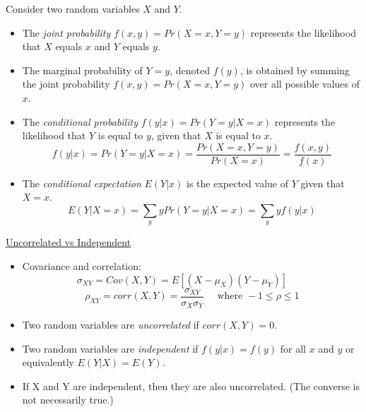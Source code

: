 \documentclass{./../../Latex/handout}
\begin{document}
\thispagestyle{plain}

\vspace{-0.25em}
Consider two random variables $X$ and $Y$. \vspace{-0.5em}
\begin{itemize}
	\item The \textit{joint probability} $f(x,y)=Pr(X=x, Y=y)$ represents the likelihood that $X$ equals $x$ and $Y$ equals $y$. 
	\item The marginal probability of \( Y=y \), denoted \( f(y) \), is obtained by summing the joint probability \( f(x, y) = Pr(X = x, Y = y) \) over all possible values of \( x \).
	\item The \textit{conditional probability} $f(y | x)= Pr(Y=y| X=x)$ represents the likelihood that $Y$ is equal to $y$, given that $X$ is equal to $x$.
$$ f(y | x) = Pr(Y=y| X=x) = \frac{Pr(X=x, Y=y)}{Pr(X=x)} = \frac{f(x,y)}{f(x)}$$
\item The \textit{conditional expectation} $E(Y|x)$ is the expected value of $Y$ given that $X=x$.
$$ E(Y|X=x) = \sum_{y} y Pr(Y=y | X=x) = \sum_{y} y f(y | x) $$

\end{itemize}

\underline{Uncorrelated vs Independent} \vspace{-0.5em}
\begin{itemize}
\item Covariance and correlation:
$$ \sigma_{XY} = Cov(X,Y) = E[(X-\mu_X)(Y-\mu_Y)] \quad \quad  $$ 
$$ \rho_{XY} = corr(X,Y) = \frac{\sigma_{XY}}{\sigma_X \sigma_Y} \quad \text{ where } -1 \leq \rho \leq 1$$
  \item Two random variables are \textit{uncorrelated} if $ corr(X,Y)=0$.
  \item Two random variables are \textit{independent} if $ f(y|x) = f(y)$ for all $x$ and $y$ or equivalently $ E(Y|X) = E(Y)$.
  \item If X and Y are independent, then they are also uncorrelated. (The converse is not necessarily true.)
\end{itemize}
\end{document}
